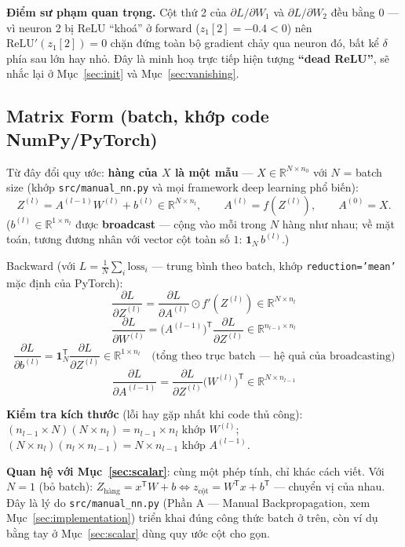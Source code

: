 \documentclass[12pt,a4paper]{article}
\newcommand{\T}{^{\mathsf{T}}}
\begin{document}
\textbf{Điểm sư phạm quan trọng.} Cột thứ 2 của $\partial L/\partial W_1$
và $\partial L/\partial W_2$ đều bằng $0$ --- vì neuron 2 bị ReLU ``khoá'' ở
forward ($z_1[2]=-0.4<0$) nên $\mathrm{ReLU}'(z_1[2])=0$ chặn đứng toàn
bộ gradient chảy qua neuron đó, bất kể $\delta$ phía sau lớn hay nhỏ. Đây
là minh hoạ trực tiếp hiện tượng \textbf{``dead ReLU''}, sẽ nhắc lại ở
Mục~\ref{sec:init} và Mục~\ref{sec:vanishing}.

\subsection{Matrix Form (batch, khớp code NumPy/PyTorch)}
\label{sec:matrixform}

Từ đây đổi quy ước: \textbf{hàng của $X$ là một mẫu} ---
$X\in\mathbb R^{N\times n_0}$ với $N$ = batch size (khớp
\texttt{src/manual\_nn.py} và mọi framework deep learning phổ biến):
$$Z^{(l)} = A^{(l-1)}W^{(l)} + b^{(l)} \in \mathbb R^{N\times n_l},\qquad
A^{(l)} = f(Z^{(l)}),\qquad A^{(0)}=X.$$
($b^{(l)}\in\mathbb R^{1\times n_l}$ được \textbf{broadcast} --- cộng vào
mỗi trong $N$ hàng như nhau; về mặt toán, tương đương nhân với vector cột
toàn số $1$: $\mathbf 1_N\, b^{(l)}$.)

Backward (với $L=\tfrac1N\sum_i \mathrm{loss}_i$ --- trung bình theo batch,
khớp \texttt{reduction='mean'} mặc định của PyTorch):
$$\frac{\partial L}{\partial Z^{(l)}} = \frac{\partial L}{\partial A^{(l)}}\odot f'(Z^{(l)}) \in \mathbb R^{N\times n_l}$$
$$\frac{\partial L}{\partial W^{(l)}} = \big(A^{(l-1)}\big)\T\frac{\partial L}{\partial Z^{(l)}} \in \mathbb R^{n_{l-1}\times n_l}$$
$$\frac{\partial L}{\partial b^{(l)}} = \mathbf 1_N\T\frac{\partial L}{\partial Z^{(l)}} \in \mathbb R^{1\times n_l}\quad\text{(tổng theo trục batch --- hệ quả của broadcasting)}$$
$$\frac{\partial L}{\partial A^{(l-1)}} = \frac{\partial L}{\partial Z^{(l)}}\big(W^{(l)}\big)\T \in \mathbb R^{N\times n_{l-1}}$$

\textbf{Kiểm tra kích thước} (lỗi hay gặp nhất khi code thủ công):
$(n_{l-1}\times N)(N\times n_l)=n_{l-1}\times n_l$ khớp $W^{(l)}$;
$(N\times n_l)(n_l\times n_{l-1})=N\times n_{l-1}$ khớp $A^{(l-1)}$.

\textbf{Quan hệ với Mục~\ref{sec:scalar}}: cùng một phép tính, chỉ khác
cách viết. Với $N=1$ (bỏ batch): $Z_{\text{hàng}} = x\T W+b
\Leftrightarrow z_{\text{cột}} = W\T x+b\T$ --- chuyển vị của nhau. Đây là
lý do \texttt{src/manual\_nn.py} (Phần A --- Manual Backpropagation, xem
Mục~\ref{sec:implementation}) triển khai đúng công thức batch ở trên, còn
ví dụ bằng tay ở Mục~\ref{sec:scalar} dùng quy ước cột cho gọn.
\end{document}
